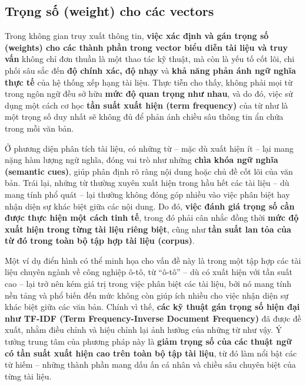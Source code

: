 \subsection{Trọng số (weight) cho các vectors}
Trong không gian truy xuất thông tin, \textbf{việc xác định và gán trọng số (weights) cho các thành phần trong vector biểu diễn tài liệu và truy vấn} không chỉ đơn thuần là một thao tác kỹ thuật, mà còn là yếu tố cốt lõi, chi phối sâu sắc đến \textbf{độ chính xác, độ nhạy} và \textbf{khả năng phản ánh ngữ nghĩa thực tế} của hệ thống xếp hạng tài liệu. Thực tiễn cho thấy, không phải mọi từ trong ngôn ngữ đều sở hữu \textbf{mức độ quan trọng như nhau}, và do đó, việc sử dụng một cách cơ học \textbf{tần suất xuất hiện (term frequency)} của từ như là một trọng số duy nhất sẽ không đủ để phản ánh chiều sâu thông tin ẩn chứa trong mỗi văn bản.

Ở phương diện phân tích tài liệu, có những từ -- mặc dù xuất hiện ít -- lại mang nặng hàm lượng ngữ nghĩa, đóng vai trò như những \textbf{chìa khóa ngữ nghĩa (semantic cues)}, giúp phân định rõ ràng nội dung hoặc chủ đề cốt lõi của văn bản. Trái lại, những từ thường xuyên xuất hiện trong hầu hết các tài liệu -- dù mang tính phổ quát -- lại thường không đóng góp nhiều vào việc phân biệt hay nhận diện sự khác biệt giữa các nội dung. Do đó, \textbf{việc đánh giá trọng số cần được thực hiện một cách tinh tế}, trong đó phải cân nhắc đồng thời \textbf{mức độ xuất hiện trong từng tài liệu riêng biệt}, cũng như \textbf{tần suất lan tỏa của từ đó trong toàn bộ tập hợp tài liệu (corpus)}.

Một ví dụ điển hình có thể minh họa cho vấn đề này là trong một tập hợp các tài liệu chuyên ngành về công nghiệp ô-tô, từ ``ô-tô'' -- dù có xuất hiện với tần suất cao -- lại trở nên kém giá trị trong việc phân biệt các tài liệu, bởi nó mang tính nền tảng và phổ biến đến mức không còn giúp ích nhiều cho việc nhận diện sự khác biệt giữa các văn bản. Chính vì thế, \textbf{các kỹ thuật gán trọng số hiện đại như TF-IDF (Term Frequency-Inverse Document Frequency)} đã được đề xuất, nhằm điều chỉnh và hiệu chỉnh lại ảnh hưởng của những từ như vậy. Ý tưởng trung tâm của phương pháp này là \textbf{giảm trọng số của các thuật ngữ có tần suất xuất hiện cao trên toàn bộ tập tài liệu}, từ đó làm nổi bật các từ hiếm -- những thành phần mang dấu ấn cá nhân và chiều sâu chuyên biệt của từng tài liệu.






